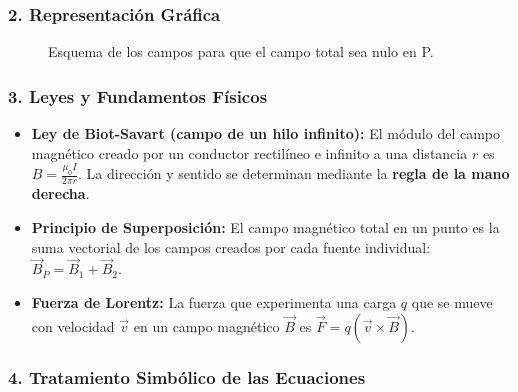 \subsubsection*{2. Representación Gráfica}
\begin{figure}[H]
    \centering
    \caption{Esquema de los campos para que el campo total sea nulo en P.}
\end{figure}

\subsubsection*{3. Leyes y Fundamentos Físicos}
\begin{itemize}
    \item \textbf{Ley de Biot-Savart (campo de un hilo infinito):} El módulo del campo magnético creado por un conductor rectilíneo e infinito a una distancia $r$ es $B = \frac{\mu_0 I}{2\pi r}$. La dirección y sentido se determinan mediante la \textbf{regla de la mano derecha}.
    \item \textbf{Principio de Superposición:} El campo magnético total en un punto es la suma vectorial de los campos creados por cada fuente individual: $\vec{B}_P = \vec{B}_1 + \vec{B}_2$.
    \item \textbf{Fuerza de Lorentz:} La fuerza que experimenta una carga $q$ que se mueve con velocidad $\vec{v}$ en un campo magnético $\vec{B}$ es $\vec{F} = q(\vec{v} \times \vec{B})$.
\end{itemize}

\subsubsection*{4. Tratamiento Simbólico de las Ecuaciones}

